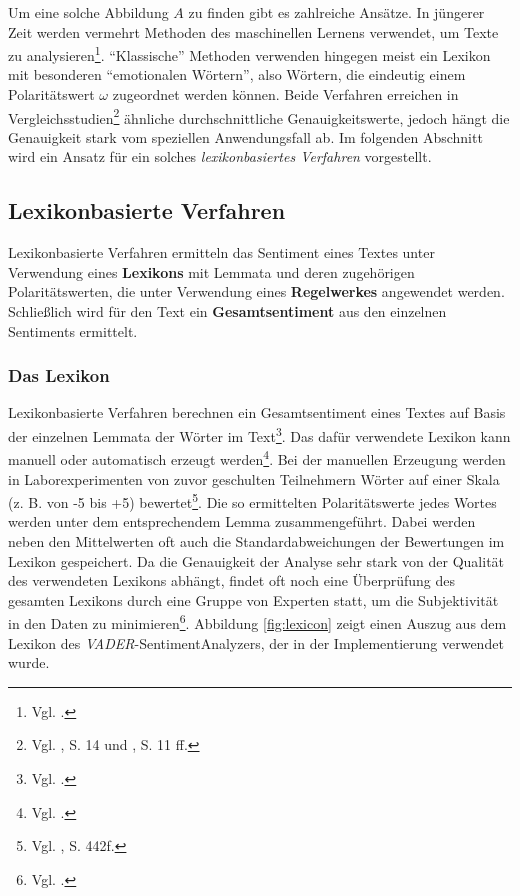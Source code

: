 \documentclass[
	a4paper,
	12pt,
	bibliography=totocnumbered,
	twoside,
]{scrreprt}
\begin{document}
Um eine solche Abbildung $A$ zu finden gibt es zahlreiche Ansätze. In jüngerer Zeit werden vermehrt Methoden des maschinellen Lernens verwendet, um Texte zu analysieren\footnote{Vgl. \citet{boiy2009}.}. "`Klassische"' Methoden verwenden hingegen meist ein Lexikon mit besonderen "`emotionalen Wörtern"', also Wörtern, die eindeutig einem Polaritätswert $\omega$ zugeordnet werden können. Beide Verfahren erreichen in Vergleichsstudien\footnote{Vgl. \citet{dhaoui2017}, S. 14 und \citet{kolchyna2015}, S. 11 ff.} ähnliche durchschnittliche Genauigkeitswerte, jedoch hängt die Genauigkeit stark vom speziellen Anwendungsfall ab. Im folgenden Abschnitt wird ein Ansatz für ein solches \textit{lexikonbasiertes Verfahren} vorgestellt.
\clearpage


\subsection*{Lexikonbasierte Verfahren}
\label{subsec:lexicon-based}

Lexikonbasierte Verfahren ermitteln das Sentiment eines Textes unter Verwendung eines \textbf{Lexikons} mit Lemmata und deren zugehörigen Polaritätswerten, die unter Verwendung eines \textbf{Regelwerkes} angewendet werden. Schließlich wird für den Text ein \textbf{Gesamtsentiment} aus den einzelnen Sentiments ermittelt.\\

\subsubsection*{Das Lexikon}
Lexikonbasierte Verfahren berechnen ein Gesamtsentiment eines Textes auf Basis der einzelnen Lemmata der Wörter im Text\footnote{Vgl. \citet{turney2002}.}. Das dafür verwendete Lexikon kann manuell oder automatisch erzeugt werden\footnote{Vgl. \citet{stone1966}.}.
Bei der manuellen Erzeugung werden in Laborexperimenten von zuvor geschulten Teilnehmern Wörter auf einer Skala (z. B. von -5 bis +5) bewertet\footnote{Vgl. \citet{dodds2010}, S. 442f.}. Die so ermittelten Polaritätswerte jedes Wortes werden unter dem entsprechendem Lemma zusammengeführt. Dabei werden neben den Mittelwerten oft auch die Standardabweichungen der Bewertungen im Lexikon gespeichert. Da die Genauigkeit der Analyse sehr stark von der Qualität des verwendeten Lexikons abhängt, findet oft noch eine Überprüfung des gesamten Lexikons durch eine Gruppe von Experten statt, um die Subjektivität in den Daten zu minimieren\footnote{Vgl. \citet{taboada2011}.}. Abbildung \ref{fig:lexicon} zeigt einen Auszug aus dem Lexikon des \textit{VADER}-SentimentAnalyzers, der in der Implementierung verwendet wurde.\\
\end{document}
